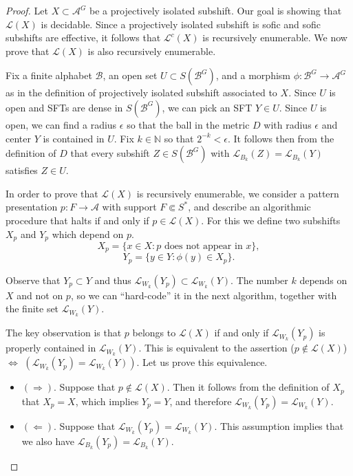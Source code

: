 \documentclass[a4paper,oneside]{amsart}
\renewcommand{\(}{\begin{dmath*}}
\renewcommand{\)}{\end{dmath*}}
\theoremstyle{definition}
\newcommand{\N}{\mathbb{N}}
\newcommand{\Le}{\mathcal{L}}
\newcommand{\Lep}{\mathscr{L}}
\newcommand{\A}{\mathcal{A}}
\newcommand{\B}{\mathcal{B}}
\begin{document}
\begin{proof}
    Let $X\subset \A^G$ be a projectively isolated subshift. Our goal is showing that $\Lep(X)$ is decidable. Since a projectively isolated subshift is sofic and sofic subshifts are effective, it follows that $\Lep^c(X)$ is recursively enumerable. We now prove that $\Lep(X)$ is also recursively enumerable. 

    

    Fix a finite alphabet $\B$, an open set $U\subset S(\B^G)$, and a morphism $\phi\colon \B^G\to \A^G$ as in the definition of projectively isolated subshift associated to $X$. Since $U$ is open and SFTs are dense in $S(\B^G)$, we can pick an SFT $Y\in U$. Since $U$ is open, we can find a radius $\epsilon$ so that the ball in the metric $D$ with radius $\epsilon$ and center $Y$ is contained in $U$. Fix $k\in\N$ so that $2^{-k}<\epsilon$. It follows then from the definition of $D$ that every subshift $Z\in S(\B^G)$ with $\Le_{B_k}(Z)=\Le_{B_k}(Y)$ satisfies $Z\in U$. 

    In order to prove that $\Lep(X)$ is recursively enumerable, we consider a pattern presentation $p\colon F\to \A$ with support $F\Subset S^\ast$, and describe an algorithmic procedure that halts if and only if $p\in\Lep(X)$. For this we define two subshifts $X_p$ and $Y_p$ which depend on $p$.
    \[X_p=\{x\in X : \text{$p$ does not appear in $x$}\},\] 
    \[Y_p=\{y \in Y : \phi(y)\in X_p\}.\]
    
    Observe that $Y_p\subset Y$ and thus $\Lep_{W_k}(Y_p)\subset \Lep_{W_k}(Y)$. The number $k$ depends on $X$ and not on $p$, so we can ``hard-code'' it in the next algorithm, together with the finite set $\Lep_{W_k}(Y)$. 
    
    The key observation is that $p$ belongs to $\Lep(X)$ if and only if $\Lep_{W_k}(Y_p)$ is properly contained in $\Lep_{W_k}(Y)$. This is equivalent to the assertion ($p\not\in\Lep(X)$) $\iff$ $(\Lep_{W_k}(Y_p)=\Lep_{W_k}(Y))$. Let us prove this equivalence. 
    \begin{itemize}
        \item $(\Rightarrow)$. Suppose that $p\not\in\Lep(X)$. Then it follows from the definition of $X_p$ that $X_p=X$, which implies $Y_p=Y$, and therefore $\Lep_{W_k}(Y_p)=\Lep_{W_k}(Y)$. 
        \item $(\Leftarrow)$. Suppose that $\Lep_{W_k}(Y_p)=\Lep_{W_k}(Y)$. This assumption implies that we also have $\Le_{B_k}(Y_p)=\Le_{B_k}(Y)$.


\end{itemize}
\end{proof}
\end{document}
